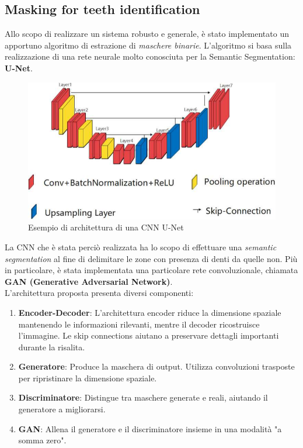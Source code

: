 \documentclass[12pt,a4paper,openright,twoside]{book}
\begin{document}
\subsection{Masking for teeth identification}
Allo scopo di realizzare un sistema robusto e generale, è stato implementato un apportuno algoritmo di estrazione di {\itshape maschere binarie}.
L'algoritmo si basa sulla realizzazione di una rete neurale molto conosciuta per la Semantic Segmentation: \textbf{U-Net}.
\begin{figure}[H]
  	\centering
   	\includegraphics[width=14cm]{figures/unet.pdf}
    	\caption{Esempio di architettura di una CNN U-Net}
	\label{fig:unet}
\end{figure}

La CNN che è stata perciò realizzata ha lo scopo di effettuare una {\itshape semantic segmentation} al fine di delimitare le zone con presenza di denti da quelle non. Più in particolare, è stata implementata una particolare rete convoluzionale, chiamata \textbf{GAN (Generative Adversarial Network)}.\\

L'architettura proposta presenta diversi componenti:
\begin{enumerate}
\item \textbf{Encoder-Decoder}: L'architettura encoder riduce la dimensione spaziale mantenendo le informazioni rilevanti, mentre il decoder ricostruisce l'immagine. Le skip connections aiutano a preservare dettagli importanti durante la risalita.
\item \textbf{Generatore}: Produce la maschera di output. Utilizza convoluzioni trasposte per ripristinare la dimensione spaziale.
\item \textbf{Discriminatore}: Distingue tra maschere generate e reali, aiutando il generatore a migliorarsi.
\item \textbf{GAN}: Allena il generatore e il discriminatore insieme in una modalità  "a somma zero".
\end{enumerate}
\end{document}
